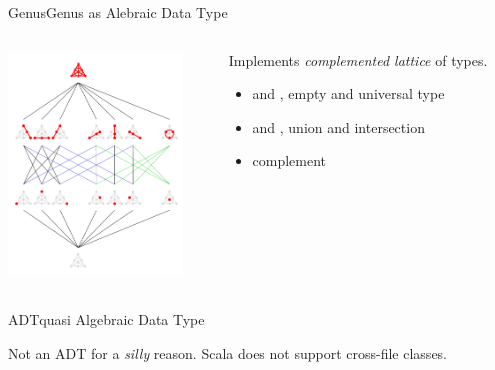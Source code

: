 \begin{frame}{Genus}{Genus as Alebraic Data Type}

  \begin{columns}

    \begin{column}{0.4\textwidth}
  
      \includegraphics[height=6cm]{Fano_plane_Hasse_diagram} 
    \end{column}
    \begin{column}{0.6\textwidth}%
      Implements \emph{complemented lattice} of types.

      \medskip
      
  \begin{itemize}
  \item {} and , empty and universal type
  \item {} and , union and intersection
  \item {} complement
  \end{itemize}
      
    \end{column}
  \end{columns}
  
\end{frame}

\newsavebox\adtbox
\begin{lrbox}{\adtbox}
  \begin{minipage}{11cm}
    
  \end{minipage}
\end{lrbox}



\begin{frame}{ADT}{quasi Algebraic Data Type}

  \usebox\adtbox

  Not an ADT for a \emph{silly} reason.  Scala does not support cross-file  classes.
\end{frame}

